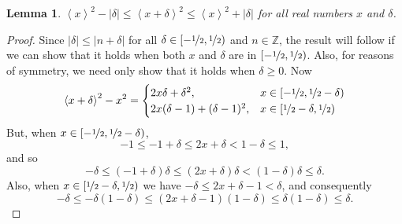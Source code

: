 \documentclass[aap]{imsart}
\newcommand{\ints}{{\mathbb Z}}
\newcommand{\fracpart}[1]{\left\langle #1 \right\rangle}
\newcommand{\abs}[1]{\left\vert #1 \right\vert}
\newtheorem{lemma}{Lemma}
\begin{document}
\begin{lemma}\label{lem:boundedsquarefracparts}
$\fracpart{x}^2 - |\delta| \leq \fracpart{x + \delta}^2 \leq \fracpart{x}^2 + |\delta|$ for all real numbers $x$ and $\delta$.
\end{lemma}
\begin{proof}
Since $\abs{\delta} \leq \abs{n + \delta}$ for all $\delta \in [-\nicefrac{1}{2}, \nicefrac{1}{2})$ and $n \in \ints$, the result will follow if we can show that it holds when both $x$ and $\delta$ are in $[-\nicefrac{1}{2}, \nicefrac{1}{2})$.  Also, for reasons of symmetry, we need only show that it holds when $\delta \geq 0$.  Now
\[
\fracpart{x + \delta}^2 - x^2 = \begin{cases}
2x\delta + \delta^2, & x \in [-\nicefrac{1}{2}, \nicefrac{1}{2} - \delta) \\
2x(\delta-1) + (\delta-1)^2, & x \in [\nicefrac{1}{2} - \delta, \nicefrac{1}{2})
\end{cases}
\] 
But, when $x \in [-\nicefrac{1}{2}, \nicefrac{1}{2} - \delta)$, 
\[
-1 \leq -1 + \delta \leq 2x + \delta < 1 - \delta \leq 1,
\]
and so
\[
-\delta \leq (-1 + \delta)\delta \leq (2x + \delta)\delta < (1-\delta)\delta \leq \delta.
\]
Also, when $x \in [\nicefrac{1}{2} - \delta, \nicefrac{1}{2})$ we  have $-\delta \leq 2x + \delta - 1 < \delta$, and consequently
\[
-\delta \leq -\delta(1-\delta) \leq (2x + \delta - 1)(1 - \delta) \leq \delta(1 - \delta) \leq \delta.
\]


\end{proof}
\end{document}
